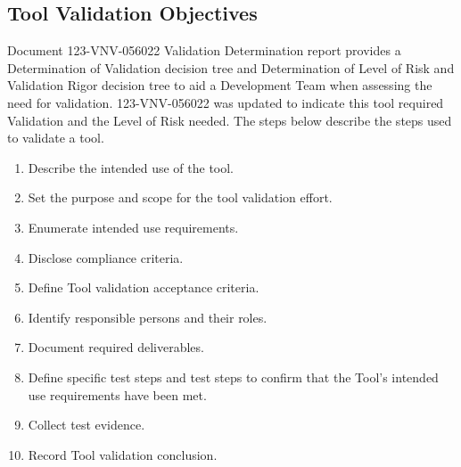 \subsection{Tool Validation Objectives}
Document 123-VNV-056022 Validation Determination  report provides a
Determination of Validation decision tree and Determination of Level of Risk and
Validation Rigor decision tree to aid a Development Team when assessing the need
for validation.  123-VNV-056022 was updated to indicate this tool required
Validation and the Level of Risk needed. The steps below describe the
steps used to validate a tool.

\begin{enumerate}
  \item Describe the intended use of the tool.
  \item Set the purpose and scope for the tool validation effort.
  \item Enumerate intended use requirements.
  \item Disclose compliance criteria.
  \item Define Tool validation acceptance criteria.
  \item Identify responsible persons and their roles.
  \item Document required deliverables.
  \item Define specific test steps and test steps to confirm that the Tool's
    intended use requirements have been met.
  \item Collect test evidence.
  \item Record Tool validation conclusion.
\end{enumerate}
